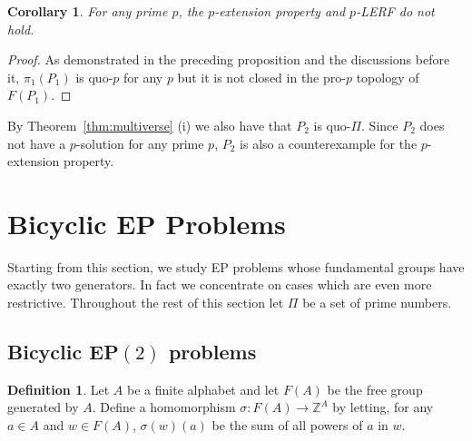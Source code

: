 \documentclass[11pt]{amsart}
\newtheorem{corollary}[theorem]{Corollary}
\theoremstyle{definition}
\newtheorem{definition}[theorem]{Definition}
\theoremstyle{definition}
\numberwithin{equation}{section}
\begin{document}
\begin{corollary} For any prime $p$, the $p$-extension property and $p$-LERF do not hold.
\end{corollary}

\begin{proof} As demonstrated in the preceding proposition and the discussions before it, $\pi_1(P_1)$ is quo-$p$ for any $p$ but it is not closed in the pro-$p$ topology of $F(P_1)$. 
\end{proof}

By Theorem~\ref{thm:multiverse} (i) we also have that $P_2$ is quo-$\Pi$. Since $P_2$ does not have a $p$-solution for any prime $p$, $P_2$ is also a counterexample for the $p$-extension property.






































\section{Bicyclic EP Problems}

Starting from this section, we study EP problems whose fundamental groups have exactly two generators. In fact we concentrate on cases which are even more restrictive. Throughout the rest of this section let $\Pi$ be a set of prime numbers.



\subsection{Bicyclic EP$(2)$ problems} 

\begin{definition} Let $A$ be a finite alphabet and let $F(A)$ be the free group generated by $A$. Define a homomorphism $\sigma\colon F(A)\to \mathbb{Z}^A$ by letting, for any $a\in A$ and $w\in F(A)$, $\sigma(w)(a)$ be the sum of all powers of $a$ in $w$. 
\end{definition}
\end{document}
